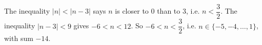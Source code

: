The inequality $|n|<|n-3|$ says $n$ is closer to $0$ than to $3$, i.e. $n<\dfrac{3}{2}$. The inequality $|n-3|<9$ gives $-6<n<12$. So $-6<n<\dfrac{3}{2}$, i.e. $n\in\{-5,-4,\dots,1\}$, with sum $\boxed{-14}$.
